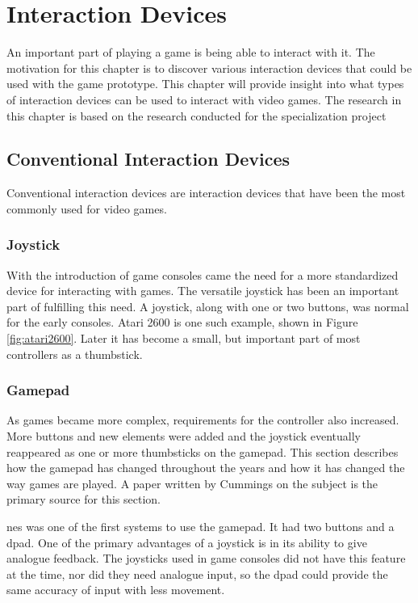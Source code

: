 \chapter{Interaction Devices}
\label{chap:interaction}
An important part of playing a game is being able to interact with it. The motivation for this chapter is to discover various interaction devices that could be used with the game prototype. This chapter will provide insight into what types of interaction devices can be used to interact with video games. The research in this chapter is based on the research conducted for the specialization project \cite{hovind2015alternative}


\section{Conventional Interaction Devices}
Conventional interaction devices are interaction devices that have been the most commonly used for video games.

\subsection{Joystick}
With the introduction of game consoles came the need for a more standardized device for interacting with games.
The versatile joystick has been an important part of fulfilling this need.
A joystick, along with one or two buttons, was normal for the early consoles.
Atari 2600 is one such example, shown in Figure \ref{fig:atari2600}.
Later it has become a small, but important part of most controllers as a thumbstick.

\subsection{Gamepad}
As games became more complex, requirements for the controller also increased.
More buttons and new elements were added and the joystick eventually reappeared as one or more thumbsticks on the gamepad.
This section describes how the gamepad has changed throughout the years and how it has changed the way games are played.
A paper written by Cummings \cite{cummings2007evolution} on the subject is the primary source for this section.

\gls{nes} was one of the first systems to use the gamepad.
It had two buttons and a \gls{dpad}.
One of the primary advantages of a joystick is in its ability to give analogue feedback.
The joysticks used in game consoles did not have this feature at the time, nor did they need analogue input, so the \gls{dpad} could provide the same accuracy of input with less movement.

